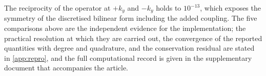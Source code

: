 The reciprocity of the operator at $+k_y$ and $-k_y$ holds to $10^{-13}$, which
exposes the symmetry of the discretised bilinear form including the added
coupling.  The five comparisons above are the independent evidence for the
implementation; the practical resolution at which they are carried out, the
convergence of the reported quantities with degree and quadrature, and the
conservation residual are stated in \cref{app:repro}, and the full computational
record is given in the supplementary document that accompanies the article.
